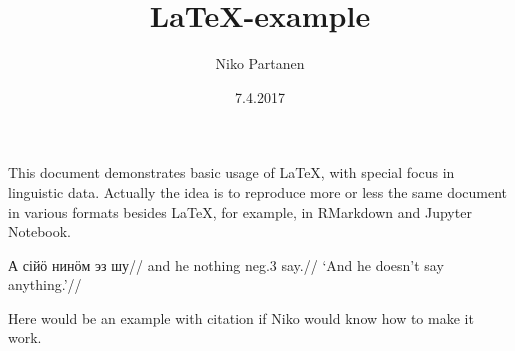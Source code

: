\documentclass[a4paper, 12pt, english]{article}
\title{\LaTeX-example}
\author{Niko Partanen}
\date{7.4.2017}
\begin{document}
\maketitle 

This document demonstrates basic usage of \LaTeX, with special focus in linguistic data. Actually the idea is to reproduce more or less the same document in various formats besides LaTeX, for example, in RMarkdown and Jupyter Notebook.


\ex
\begingl
\gla А сійӧ нинӧм эз шу//
\glb and he nothing neg.3 say.//
\glft ‘And he doesn't say anything.’//
\endgl
\xe 

Here would be an example with citation if Niko would know how to make it work.

   
 
\end{document}
